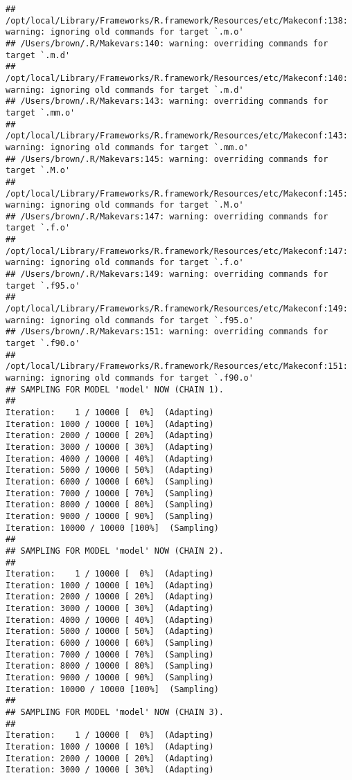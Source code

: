 \documentclass{article}\usepackage[]{graphicx}\usepackage[]{color}
\makeatletter
\newenvironment{kframe}{%
 \def\at@end@of@kframe{}%
 \ifinner\ifhmode%
  \def\at@end@of@kframe{\end{minipage}}%
  \begin{minipage}{\columnwidth}%
 \fi\fi%
 \def\FrameCommand##1{\hskip\@totalleftmargin \hskip-\fboxsep
 \colorbox{shadecolor}{##1}\hskip-\fboxsep
     \hskip-\linewidth \hskip-\@totalleftmargin \hskip\columnwidth}%
 \MakeFramed {\advance\hsize-\width
   \@totalleftmargin\z@ \linewidth\hsize
   \@setminipage}}%
 {\par\unskip\endMakeFramed%
 \at@end@of@kframe}
\newenvironment{knitrout}{}{} %
\makeatother
\begin{document}
\begin{knitrout}
\begin{kframe}
\begin{verbatim}
## /opt/local/Library/Frameworks/R.framework/Resources/etc/Makeconf:138: warning: ignoring old commands for target `.m.o'
## /Users/brown/.R/Makevars:140: warning: overriding commands for target `.m.d'
## /opt/local/Library/Frameworks/R.framework/Resources/etc/Makeconf:140: warning: ignoring old commands for target `.m.d'
## /Users/brown/.R/Makevars:143: warning: overriding commands for target `.mm.o'
## /opt/local/Library/Frameworks/R.framework/Resources/etc/Makeconf:143: warning: ignoring old commands for target `.mm.o'
## /Users/brown/.R/Makevars:145: warning: overriding commands for target `.M.o'
## /opt/local/Library/Frameworks/R.framework/Resources/etc/Makeconf:145: warning: ignoring old commands for target `.M.o'
## /Users/brown/.R/Makevars:147: warning: overriding commands for target `.f.o'
## /opt/local/Library/Frameworks/R.framework/Resources/etc/Makeconf:147: warning: ignoring old commands for target `.f.o'
## /Users/brown/.R/Makevars:149: warning: overriding commands for target `.f95.o'
## /opt/local/Library/Frameworks/R.framework/Resources/etc/Makeconf:149: warning: ignoring old commands for target `.f95.o'
## /Users/brown/.R/Makevars:151: warning: overriding commands for target `.f90.o'
## /opt/local/Library/Frameworks/R.framework/Resources/etc/Makeconf:151: warning: ignoring old commands for target `.f90.o'
## SAMPLING FOR MODEL 'model' NOW (CHAIN 1).
## 
Iteration:    1 / 10000 [  0%]  (Adapting)
Iteration: 1000 / 10000 [ 10%]  (Adapting)
Iteration: 2000 / 10000 [ 20%]  (Adapting)
Iteration: 3000 / 10000 [ 30%]  (Adapting)
Iteration: 4000 / 10000 [ 40%]  (Adapting)
Iteration: 5000 / 10000 [ 50%]  (Adapting)
Iteration: 6000 / 10000 [ 60%]  (Sampling)
Iteration: 7000 / 10000 [ 70%]  (Sampling)
Iteration: 8000 / 10000 [ 80%]  (Sampling)
Iteration: 9000 / 10000 [ 90%]  (Sampling)
Iteration: 10000 / 10000 [100%]  (Sampling)
## 
## SAMPLING FOR MODEL 'model' NOW (CHAIN 2).
## 
Iteration:    1 / 10000 [  0%]  (Adapting)
Iteration: 1000 / 10000 [ 10%]  (Adapting)
Iteration: 2000 / 10000 [ 20%]  (Adapting)
Iteration: 3000 / 10000 [ 30%]  (Adapting)
Iteration: 4000 / 10000 [ 40%]  (Adapting)
Iteration: 5000 / 10000 [ 50%]  (Adapting)
Iteration: 6000 / 10000 [ 60%]  (Sampling)
Iteration: 7000 / 10000 [ 70%]  (Sampling)
Iteration: 8000 / 10000 [ 80%]  (Sampling)
Iteration: 9000 / 10000 [ 90%]  (Sampling)
Iteration: 10000 / 10000 [100%]  (Sampling)
## 
## SAMPLING FOR MODEL 'model' NOW (CHAIN 3).
## 
Iteration:    1 / 10000 [  0%]  (Adapting)
Iteration: 1000 / 10000 [ 10%]  (Adapting)
Iteration: 2000 / 10000 [ 20%]  (Adapting)
Iteration: 3000 / 10000 [ 30%]  (Adapting)

\end{verbatim}
\end{kframe}
\end{knitrout}
\end{document}
